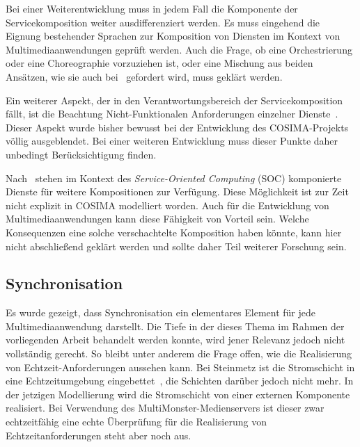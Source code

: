   Bei einer Weiterentwicklung muss in jedem Fall die Komponente der Servicekomposition weiter ausdifferenziert werden. Es muss eingehend die Eignung bestehender Sprachen zur Komposition von Diensten im Kontext von Multimediaanwendungen geprüft werden. Auch die Frage, ob eine Orchestrierung oder eine Choreographie vorzuziehen ist, oder eine Mischung aus beiden Ansätzen, wie sie auch bei~\citep{papazoglou2007soc} gefordert wird, muss geklärt werden.
  
  Ein weiterer Aspekt, der in den Verantwortungsbereich der Servicekomposition fällt, ist die Beachtung Nicht-Funktionalen Anforderungen einzelner Dienste~\citep[S. 42]{papazoglou2007soc}. Dieser Aspekt wurde bisher bewusst bei der Entwicklung des COSIMA-Projekts völlig ausgeblendet. Bei einer weiteren Entwicklung muss dieser Punkte daher unbedingt Berücksichtigung finden.

  Nach~\citep[S. 8]{service_oriented_computing} stehen im Kontext des \emph{Service-Oriented Computing} (SOC) komponierte Dienste für weitere Kompositionen zur Verfügung. Diese Möglichkeit ist zur Zeit nicht explizit in COSIMA modelliert worden. Auch für die Entwicklung von Multimediaanwendungen kann diese Fähigkeit von Vorteil sein. Welche Konsequenzen eine solche verschachtelte Komposition haben könnte, kann hier nicht abschließend geklärt werden und sollte daher Teil weiterer Forschung sein.


\subsection{Synchronisation} %
\label{sub:synchronisation}

  Es wurde gezeigt, dass Synchronisation ein elementares Element für jede Multimediaanwendung darstellt. Die Tiefe in der dieses Thema im Rahmen der vorliegenden Arbeit behandelt werden konnte, wird jener Relevanz jedoch nicht vollständig gerecht. So bleibt unter anderem die Frage offen, wie die Realisierung von Echtzeit-Anforderungen aussehen kann. Bei Steinmetz ist die Stromschicht in eine Echtzeitumgebung eingebettet~\citep[S. 604]{multimedia_technologie}, die Schichten darüber jedoch nicht mehr. In der jetzigen Modellierung wird die Stromschicht von einer externen Komponente realisiert. Bei Verwendung des MultiMonster-Medienservers ist dieser zwar echtzeitfähig eine echte Überprüfung für die Realisierung von Echtzeitanforderungen steht aber noch aus.
  
